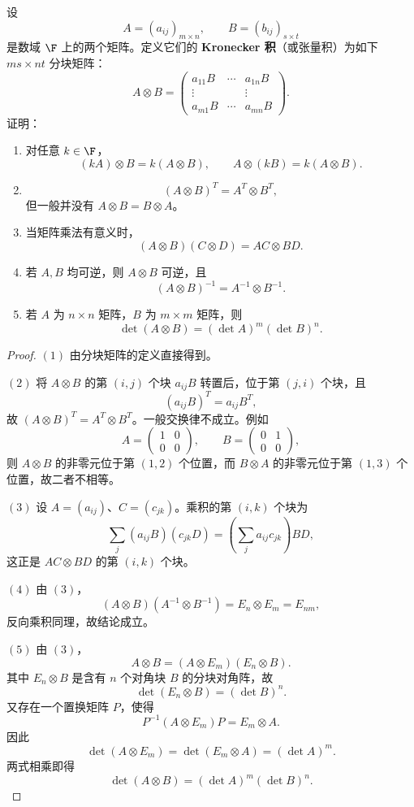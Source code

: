 \begin{problem}
设
	\[
	A=(a_{ij})_{m\times n},\qquad B=(b_{ij})_{s\times t}
	\]
	\label{p1:concept:c3-l2915}是数域 $\F$ 上的两个矩阵。定义它们的 \textbf{Kronecker 积}（或张量积）为如下 $ms\times nt$ 分块矩阵：
	\[
	A\otimes B=
	\begin{pmatrix}
		a_{11}B&\cdots&a_{1n}B\\
		\vdots&&\vdots\\
		a_{m1}B&\cdots&a_{mn}B
	\end{pmatrix}.
	\]
	证明：
	\begin{enumerate}
		\item 对任意 $k\in\F$，
		\[
		(kA)\otimes B=k(A\otimes B),
		\qquad
		A\otimes(kB)=k(A\otimes B).
		\]
		
		\item
		\[
		(A\otimes B)^T=A^T\otimes B^T,
		\]
		但一般并没有 $A\otimes B=B\otimes A$。
		
		\item 当矩阵乘法有意义时，
		\[
		(A\otimes B)(C\otimes D)=AC\otimes BD.
		\]
		
		\item 若 $A,B$ 均可逆，则 $A\otimes B$ 可逆，且
		\[
		(A\otimes B)^{-1}=A^{-1}\otimes B^{-1}.
		\]
		
		\item 若 $A$ 为 $n\times n$ 矩阵，$B$ 为 $m\times m$ 矩阵，则
		\[
		\det(A\otimes B)=(\det A)^m(\det B)^n.
		\]
	\end{enumerate}
\end{problem}

\begin{proof}
	$(1)$ 由分块矩阵的定义直接得到。
	
	$(2)$ 将 $A\otimes B$ 的第 $(i,j)$ 个块 $a_{ij}B$ 转置后，位于第 $(j,i)$ 个块，且
	\[
	(a_{ij}B)^T=a_{ij}B^T,
	\]
	故 $(A\otimes B)^T=A^T\otimes B^T$。一般交换律不成立。例如
	\[
	A=\begin{pmatrix}1&0\\0&0\end{pmatrix},
	\qquad
	B=\begin{pmatrix}0&1\\0&0\end{pmatrix},
	\]
	则 $A\otimes B$ 的非零元位于第 $(1,2)$ 个位置，而 $B\otimes A$ 的非零元位于第 $(1,3)$ 个位置，故二者不相等。
	
	$(3)$ 设 $A=(a_{ij})$、$C=(c_{jk})$。乘积的第 $(i,k)$ 个块为
	\[
	\sum_j(a_{ij}B)(c_{jk}D)
	=\left(\sum_j a_{ij}c_{jk}\right)BD,
	\]
	这正是 $AC\otimes BD$ 的第 $(i,k)$ 个块。
	
	$(4)$ 由 $(3)$，
	\[
	(A\otimes B)(A^{-1}\otimes B^{-1})
	=E_n\otimes E_m=E_{nm},
	\]
	反向乘积同理，故结论成立。
	
	$(5)$ 由 $(3)$，
	\[
	A\otimes B=(A\otimes E_m)(E_n\otimes B).
	\]
	其中 $E_n\otimes B$ 是含有 $n$ 个对角块 $B$ 的分块对角阵，故
	\[
	\det(E_n\otimes B)=(\det B)^n.
	\]
	又存在一个置换矩阵 $P$，使得
	\[
	P^{-1}(A\otimes E_m)P=E_m\otimes A.
	\]
	因此
	\[
	\det(A\otimes E_m)=\det(E_m\otimes A)=(\det A)^m.
	\]
	两式相乘即得
	\[
	\det(A\otimes B)=(\det A)^m(\det B)^n.
	\]
\end{proof}

